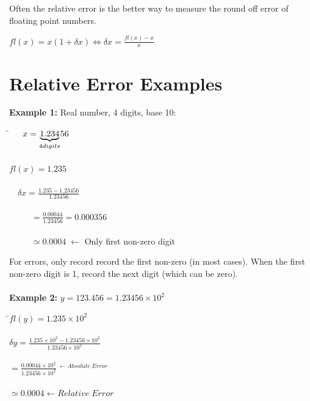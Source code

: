 \documentclass[a4paper,12pt,]{report}
\begin{document}
	Often the relative error is the better way to measure the round off error of floating point numbers.

\begin{center}
	$fl(x)=x(1+ \delta x) \Leftrightarrow \delta x = \frac{fl(x)-x}{x}$
\end{center}

\section{Relative Error Examples}

	\textbf{Example 1:} Real number, 4 digits, base 10:

\begin{tabbing}
	\hspace{3cm}\=$\quad \; \; x= \underbrace{1.234}_{\tiny{4digits}}\!56$\\
	\> \\
	\>$fl(x)=1.235$\\
	\> \\
	\>\large{$\quad \!  \delta x = \frac{1.235-1.23456}{1.23456}$}\\
	\> \\
	\>$\qquad \; \; = \frac{0.00044}{1.23456}=0.000356$\\
	\> \\
	\> $\qquad \; \; \simeq 0.0004 \; \leftarrow$ \footnotesize{Only first non-zero digit}
\end{tabbing}

	For errors, only record record the first non-zero (in most cases). When the first non-zero digit is 1, 
	record the next digit (which can be zero).\\ \\

	\noindent \textbf{Example 2:} $y=123.456 = 1.23456 \times 10^2$

\begin{tabbing}
	\hspace{3.5cm}\=$fl(y)=1.235 \times 10^2$\\
	\> \\
	\> \quad \large{$\delta y = \frac{1.235 \times 10^2-1.23456 \times 10^2}{1.23456 \times 10^2}$}\\
	\> \\
	\> \qquad \; \large{$= \frac{0.00044 \times 10^2}{1.23456 \times 10^2}\, ^{\leftarrow Absolute \; Error}$}\\
	\> \\
	\> \qquad \; $\simeq 0.0004{\leftarrow Relative \; Error}$
\end{tabbing}
\end{document}
